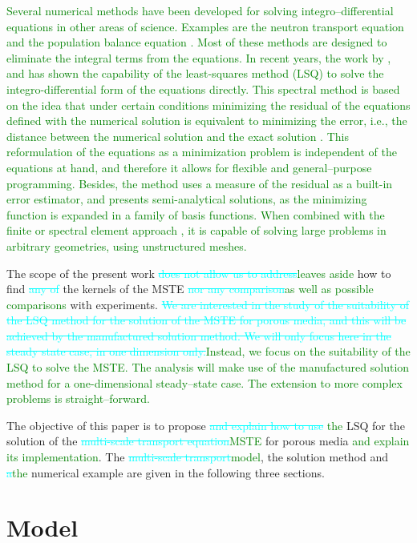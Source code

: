 \documentclass{CFD2011}
\newcommand{\newf}[1]{\textcolor{green}{#1}}
\newcommand{\nof}[1]{\textcolor{cyan}{{\sout{#1}}}}
\begin{document}
\newf{Several numerical methods have been developed for solving integro--differential equations in other areas of science. Examples are the neutron transport equation \cite{Duderstad1976} and the population balance equation \cite{Ramkrishna2000}. Most of these methods are designed to eliminate the integral terms from the equations.}
\newf{In recent years, the work by \cite{Dorao05a}, \cite{Patruno2010} and \cite{Sporleder2011} has shown the capability of the least-squares method (LSQ) to solve the integro-differential form of the equations directly. This spectral method is based on the idea that under certain conditions minimizing the residual of the equations defined with the numerical solution is equivalent to minimizing the error, i.e., the distance between the numerical solution and the exact solution \cite{Jiang1998}. This reformulation of the equations as a minimization problem is independent of the equations at hand, and therefore it allows for flexible and general--purpose programming. Besides, the method uses a measure of the residual as a built-in error estimator, and presents semi-analytical solutions, as the minimizing function is expanded in a family of basis functions. When combined with the finite or spectral element approach \cite{Gerritsma2010}, it is capable of solving large problems in arbitrary geometries, using unstructured meshes.}

The scope of the present work \nof{does not allow us to address}\newf{leaves aside} how to find \nof{any of }the kernels of the MSTE \nof{nor any comparison}\newf{as well as possible comparisons} with experiments. \nof{We are interested in the study of the suitability of the LSQ method for the solution of the MSTE for porous media, and this will be achieved by the manufactured solution method. We will only focus here in the steady state case, in one dimension only.}\newf{Instead, we focus on the suitability of the LSQ to solve the MSTE. The analysis will make use of the manufactured solution method for a one-dimensional steady--state case. The extension to more complex problems is straight--forward.}

The objective of this paper is to propose \nof{and explain how to use} \newf{the }LSQ for the solution of the \nof{multi-scale transport equation}\newf{MSTE} for porous media \newf{and explain its implementation}. The \nof{multi-scale transport}\newf{model}, the solution method and \nof{a}\newf{the} numerical example are given in the following three sections.

\section{Model}
\end{document}
